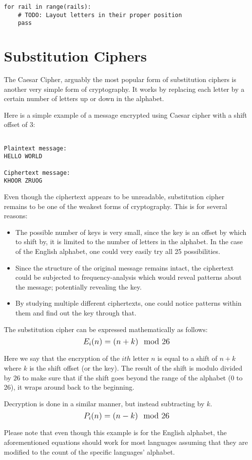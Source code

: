 \begin{verbatim}
for rail in range(rails):
    # TODO: Layout letters in their proper position
    pass
\end{verbatim}

\section{Substitution Ciphers}

The Caesar Cipher, arguably the most popular form of substitution ciphers is another very simple form of cryptography. 
It works by replacing each letter by a certain number of letters up or down in the alphabet. 

Here is a simple example of a message encrypted using Caesar cipher with a shift offset of 3:

\begin{verbatim}

Plaintext message: 
HELLO WORLD
               
Ciphertext message:
KHOOR ZRUOG
\end{verbatim}

Even though the ciphertext appears to be unreadable, substitution cipher remains to be one of the weakest forms of cryptography. 
This is for several reasons:
\begin{itemize}  
    \item The possible number of keys is very small, since the key is an offset by which to shift by, it is limited to the number of letters in the alphabet.
    In the case of the English alphabet, one could very easily try all 25 possibilities. 
    \item Since the structure of the original message remains intact, the ciphertext could be subjected to frequency-analysis which would reveal patterns about the message;
    potentially revealing the key.
    \item By studying multiple different ciphertexts, one could notice patterns within them and find out the key through that.
\end{itemize}

The substitution cipher can be expressed mathematically as follows: $$\mathlarger{E_i(n)=(n+k)\mod{26}}$$

Here we say that the encryption of the $ith$ letter $n$ is equal to a shift of $n+k$ where $k$ is the shift offset (or the key). The result of the shift
is modulo divided by $26$ to make sure that if the shift goes beyond the range of the alphabet (0 to 26),  it wraps around back to the beginning.

Decryption is done in a similar manner, but instead subtracting by $k$. $$\mathlarger{P_i(n)=(n-k)\mod{26}}$$

Please note that even though this example is for the English alphabet, the aforementioned equations should work for most languages assuming that they are modified
to the count of the specific languages' alphabet.
